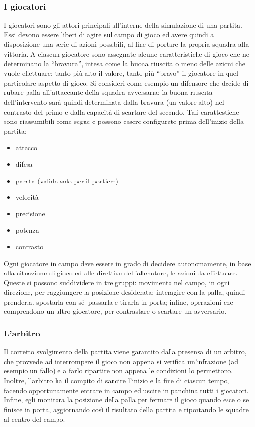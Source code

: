 \subsubsection{I giocatori}
\label{sec:analisi_giocatori}

I giocatori sono gli attori principali all'interno della simulazione di una partita. Essi devono essere liberi di agire sul campo di gioco ed avere quindi a disposizione una serie di azioni possibili, al fine di portare la propria squadra alla vittoria. A ciascun giocatore sono assegnate alcune caratteristiche di gioco che ne determinano la ``bravura'', intesa come la buona riuscita o meno delle azioni che vuole effettuare: tanto più alto il valore, tanto più ``bravo'' il giocatore in quel particolare aspetto di gioco. Si consideri come esempio un difensore che decide di rubare palla all'attaccante della squadra avversaria: la buona riuscita dell'intervento sarà quindi determinata dalla bravura (un valore alto) nel contrasto del primo e dalla capacità di scartare del secondo. Tali carattestiche sono riassumibili come segue e possono essere configurate prima dell'inizio della partita:

\begin{itemize}
	\item attacco
	\item difesa
	\item parata (valido solo per il portiere)
	\item velocità
	\item precisione
	\item potenza
	\item contrasto
\end{itemize}

Ogni giocatore in campo deve essere in grado di decidere autonomamente, in base alla situazione di gioco ed alle direttive dell'allenatore, le azioni da effettuare. Queste  si possono suddividere in tre gruppi: movimento nel campo, in ogni direzione, per raggiungere la posizione desiderata; interagire con la palla, quindi prenderla, spostarla con sé, passarla e tirarla in porta; infine, operazioni che comprendono un altro giocatore, per contrastare o scartare un avversario.\\

\subsubsection{L'arbitro}
\label{sec:analisi_arbitro}

Il corretto svolgimento della partita viene garantito dalla presenza di un arbitro, che provvede ad interrompere il gioco non appena si verifica un'infrazione (ad esempio un fallo) e a farlo ripartire non appena le condizioni lo permettono. Inoltre, l'arbitro ha il compito di sancire l'inizio e la fine di ciascun tempo, facendo opportunamente entrare in campo ed uscire in panchina tutti i giocatori. Infine, egli monitora la posizione della palla per fermare il gioco quando esce o se finisce in porta, aggiornando così il risultato della partita e riportando le squadre al centro del campo.\\

